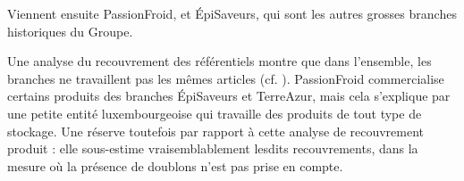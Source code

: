                 Viennent ensuite PassionFroid, et \'{E}piSaveurs, qui sont les autres \og grosses \fg branches historiques du Groupe.

                \begin{figure}[htbp]\CenterFloatBoxes
                    \begin{floatrow}
                    \end{floatrow}
                \end{figure}
                    
                Une analyse du recouvrement des référentiels montre que dans l'ensemble, les branches ne travaillent pas les mêmes articles (cf. ).
                PassionFroid commercialise certains produits des branches \'{E}piSaveurs et TerreAzur, mais cela s'explique par une petite entité luxembourgeoise qui travaille des produits de tout type de stockage.
                Une réserve toutefois par rapport à cette analyse de recouvrement produit : elle sous-estime vraisemblablement lesdits recouvrements, dans la mesure où la présence de doublons n'est pas prise en compte.

